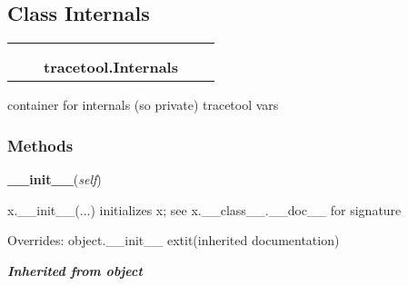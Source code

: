 

\subsection{Class Internals}

    \label{tracetool:Internals}
\begin{tabular}{cccccc}
\multicolumn{2}{r}{\settowidth{\BCL}{object}\multirow{2}{\BCL}{object}}
&&
  \\\cline{3-3}
  &&\multicolumn{1}{c|}{}
&&
  \\
&&\multicolumn{2}{l}{\textbf{tracetool.Internals}}
\end{tabular}

container for internals (so private) tracetool vars



  \subsubsection{Methods}

    \vspace{0.5ex}

\hspace{.8\funcindent}\begin{boxedminipage}{\funcwidth}

    \raggedright \textbf{\_\_init\_\_}(\textit{self})

\setlength{\parskip}{2ex}
    x.\_\_init\_\_(...) initializes x; see x.\_\_class\_\_.\_\_doc\_\_ for 
    signature

\setlength{\parskip}{1ex}
      Overrides: object.\_\_init\_\_ 	extit{(inherited documentation)}

    \end{boxedminipage}


\large{\textbf{\textit{Inherited from object}}}

